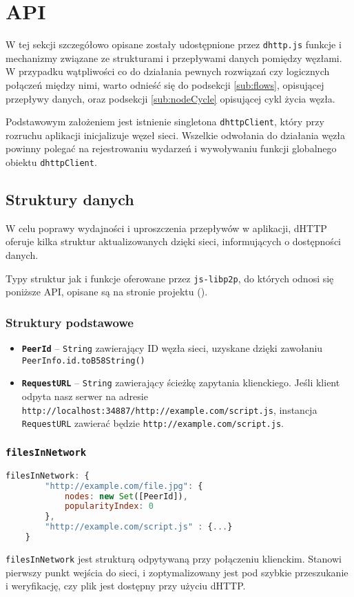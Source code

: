 \section{API}
W tej sekcji szczegółowo opisane zostały udostępnione przez \texttt{dhttp.js} funkcje i mechanizmy związane ze strukturami i przepływami danych pomiędzy węzłami. W przypadku wątpliwości co do działania pewnych rozwiązań czy logicznych połączeń między nimi, warto odnieść się do podsekcji \ref{sub:flows}, opisującej przepływy danych, oraz podsekcji \ref{sub:nodeCycle} opisującej cykl życia węzła.

Podstawowym założeniem jest istnienie singletona \texttt{dhttpClient}, który przy rozruchu aplikacji inicjalizuje węzeł sieci. Wszelkie odwołania do działania węzła powinny polegać na rejestrowaniu wydarzeń i wywoływaniu funkcji globalnego obiektu \texttt{dhttpClient}.

\subsection{Struktury danych}
W celu poprawy wydajności i uproszczenia przepływów w aplikacji, dHTTP oferuje kilka struktur aktualizowanych dzięki sieci, informujących o dostępności danych.

Typy struktur jak i funkcje oferowane przez \texttt{js-libp2p}, do których odnosi się poniższe API, opisane są na stronie projektu (\cite{libp2pReadme}).

\subsubsection{Struktury podstawowe}
\begin{itemize}
    \item \textbf{\texttt{PeerId}} -- \texttt{String} zawierający ID węzła sieci, uzyskane dzięki zawołaniu \texttt{PeerInfo.id.toB58String()}
    \item \textbf{\texttt{RequestURL}} -- \texttt{String} zawierający ścieżkę zapytania klienckiego. Jeśli klient odpyta nasz serwer na adresie \texttt{http://localhost:34887/http://example.com/script.js}, instancja \texttt{RequestURL} zawierać będzie \texttt{http://example.com/script.js}.
\end{itemize}

\subsubsection{\texttt{filesInNetwork}}
\begin{lstlisting}[language=javascript]
filesInNetwork: {
        "http://example.com/file.jpg": {
            nodes: new Set([PeerId]),
            popularityIndex: 0
        },
        "http://example.com/script.js" : {...}
    }
\end{lstlisting}
\texttt{filesInNetwork} jest strukturą odpytywaną przy połączeniu klienckim. Stanowi pierwszy punkt wejścia do sieci, i zoptymalizowany jest pod szybkie przeszukanie i weryfikację, czy plik jest dostępny przy użyciu dHTTP.

